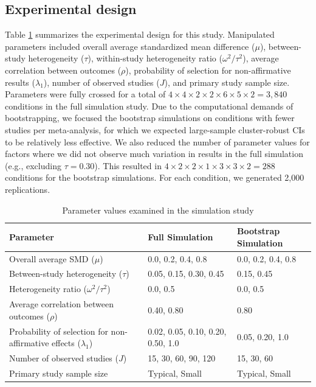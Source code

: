 \documentclass[
  american,
  man, donotrepeattitle,floatsintext]{apa7}
\begin{document}
\subsection{Experimental design}\label{experimental-design}

Table \ref{tab:sim-design} summarizes the experimental design for this study.
Manipulated parameters included overall average standardized mean difference
(\(\mu\)), between-study heterogeneity (\(\tau\)), within-study heterogeneity ratio
(\(\omega^2 / \tau^2\)), average correlation between outcomes (\(\rho\)),
probability of selection for non-affirmative results (\(\lambda_1\)), number of observed studies (\(J\)), and primary study sample size.
Parameters were fully crossed for a total of \(4 \times 4 \times 2 \times 2 \times 6 \times 5 \times 2 = 3,840\) conditions in the full simulation study.
Due to the computational demands of bootstrapping, we focused the bootstrap simulations on conditions with fewer studies per meta-analysis, for which we expected large-sample cluster-robust CIs to be relatively less effective.
We also reduced the number of parameter values for factors where we did
not observe much variation in results in the full simulation
(e.g., excluding \(\tau = 0.30\)).
This resulted in \(4 \times 2 \times 2 \times 1 \times 3 \times 3 \times 2 = 288\) conditions for the bootstrap simulations.
For each condition, we generated 2,000 replications.

\begin{table}
\centering
\caption{\label{tab:sim-design}Parameter values examined in the simulation study}
\centering
\begin{tabular}[t]{>{\raggedright\arraybackslash}p{2.5in}ll}
\toprule
Parameter & Full Simulation & Bootstrap Simulation\\
\midrule
Overall average SMD ($\mu$) & 0.0, 0.2, 0.4, 0.8 & 0.0, 0.2, 0.4, 0.8\\
Between-study heterogeneity ($\tau$) & 0.05, 0.15, 0.30, 0.45 & 0.15, 0.45\\
Heterogeneity ratio ($\omega^2 / \tau^2$) & 0.0, 0.5 & 0.0, 0.5\\
Average correlation between outcomes ($\rho$) & 0.40, 0.80 & 0.80\\
Probability of selection for non-affirmative effects ($\lambda_1$) & 0.02, 0.05, 0.10, 0.20, 0.50, 1.0 & 0.05, 0.20, 1.0\\
\addlinespace
Number of observed studies ($J$) & 15, 30, 60, 90, 120 & 15, 30, 60\\
Primary study sample size & Typical, Small & Typical, Small\\
\bottomrule
\end{tabular}
\end{table}
\end{document}
